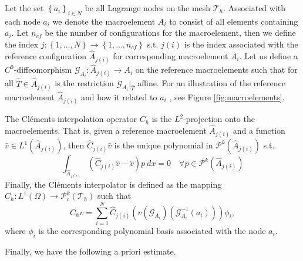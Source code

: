  Let the set  $\left\{ a_{i}\right\}_{i\in N}$ be all Lagrange nodes on the mesh $\mathcal{T}_{h}$. Associated with each node $a_{i}$ we denote the macroelement $A_{i}$ to consist of all elements containing $a_{i}$. Let $n_{cf}$ be the number of configurations for the macroelement, then we define the index $j:
\left\{ 1,\ldots,N \right\} \to \left\{ 1, \ldots, n_{cf} \right\}  $ s.t. $j( i) $ is the index associated with the reference configuration $\widehat{A}_{j(i) }$ for corresponding macroelement $A_{i}$.
Let us define a $C^{0}$-diffeomorphism $\mathcal{G}_{A_{i}}:
\widehat{A}_{j( i) } \to A_{i}$ on the reference macroelements such that for all $\hat{T} \in \widehat{A}_{j( i) } $ is the restriction $\mathcal{G} _{A_{i}}|_{ \hat{T} }$ affine. For an illustration of the reference
macroelement $\widehat{A}_{j( i) }$ and how it related to $a_{i}$ , see
Figure \ref{fig:macroelements}.

The Cléments interpolation operator $C_{h}$ is the $L^2$-projection onto the macroelements. That is, given
a reference macroelement $\widehat{A}_{j( i) }$ and a function $\hat{v} \in L^{1}( \widehat{A}_{j( i) })  $, then $\widehat{C}_{j( i) } \hat{v}$  is the unique polynomial in $\mathcal{P}^{k} ( \widehat{A}_{j( i) })  $ s.t. \[
\int_{  \widehat{A}_{j( i) }}^{} ( \widehat{C}_{j( i) } \hat{v} - \hat{v}) p \ dx  = 0 \quad  \forall p \in \mathcal{P}^{k} ( \widehat{A}_{j( i) })
\]
Finally, the Cléments interpolator is defined as the mapping $C_{h} : L^{1}( \Omega )  \to \mathcal{P} ^{k}_{c}(\mathcal{T}_{h}   ) $ such that
\[
C_{h} v = \sum_{i=1}^{N} \widehat{C}_{j( i) } ( v (\mathcal{G} _{A_{i}}) (\mathcal{G}^{-1}_{A_{i}}(a_{i})) )\phi _{i},
\]
where $\phi _{i}$ is the corresponding polynomial basis associated with the node $a_{i}$.



Finally, we have the following a priori estimate.

